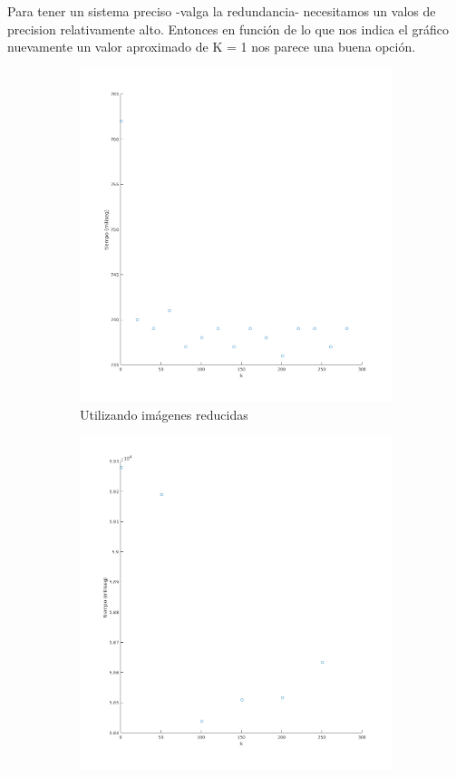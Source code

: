 Para tener un sistema preciso -valga la redundancia- necesitamos un valos de precision relativamente alto. Entonces en función de lo que nos indica el gráfico nuevamente un valor aproximado de K = 1 nos parece una buena opción.
\begin{figure}[H]
\begin{subfigure}[h]{0.62\linewidth}
\includegraphics[width=\linewidth]{img/k_knn_tiempo.png}
\caption{Utilizando imágenes reducidas}
\end{subfigure}
\hfill
\begin{subfigure}[h]{0.62\linewidth}
\includegraphics[width=\linewidth]{img/big_k_knn_tiempo.png}

\end{subfigure}
\end{figure}
